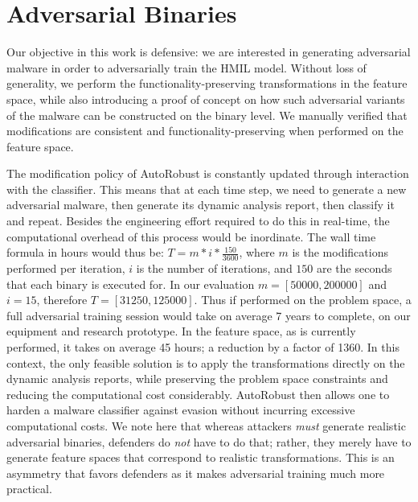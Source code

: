 \section{Adversarial Binaries}
\label{sebsec:binaries}

Our objective in this work is defensive: we are interested in generating adversarial malware in order to adversarially train the HMIL model.
Without loss of generality, we perform the functionality-preserving transformations in the feature space, while also introducing a proof of concept on how such adversarial variants of the malware can be constructed on the binary level.
We manually verified that modifications are consistent and functionality-preserving when performed on the feature space.

The modification policy of AutoRobust is constantly updated through interaction with the classifier.
This means that at each time step, we need to generate a new adversarial malware, then generate its dynamic analysis report, then classify it and repeat.
Besides the engineering effort required to do this in real-time, the computational overhead of this process would be inordinate.
The wall time formula in hours would thus be: $T = m * i * \frac{150}{3600}$, where $m$ is the modifications performed per iteration, $i$ is the number of iterations, and $150$ are the seconds that each binary is executed for.
In our evaluation $m = [50000, 200000]$ and $i = 15$, therefore $T = [31250, 125000]$.
Thus if performed on the problem space, a full adversarial training session would take on average 7 years to complete, on our equipment and research prototype.
In the feature space, as is currently performed, it takes on average 45 hours; a reduction by a factor of 1360.
In this context, the only feasible solution is to apply the transformations directly on the dynamic analysis reports, while preserving the problem space constraints and reducing the computational cost considerably.
AutoRobust then allows one to harden a malware classifier against evasion without incurring excessive computational costs.
We note here that whereas attackers \textit{must} generate realistic adversarial binaries, defenders do \textit{not} have to do that; rather, they merely have to generate feature spaces that correspond to realistic transformations.
This is an asymmetry that favors defenders as it makes adversarial training much more practical.


